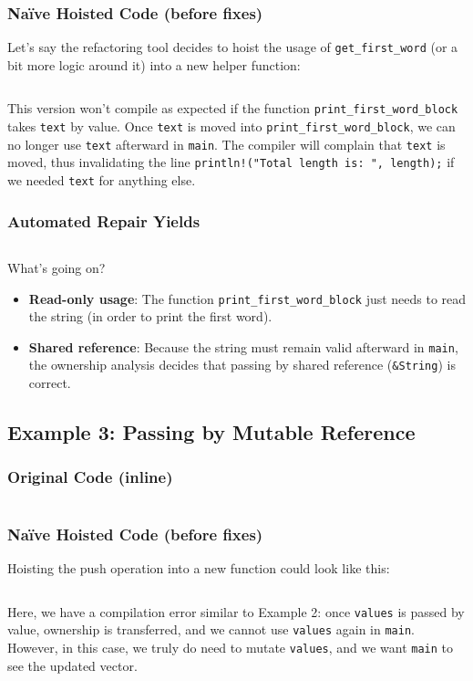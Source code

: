\subsubsection*{Na\"ive Hoisted Code (before fixes)}
Let's say the refactoring tool decides to hoist the usage of \texttt{get\_first\_word} (or
a bit more logic around it) into a new helper function:
\inputminted{rust}{6_appendices/app1_code/ex2_nhc.rs}
This version won't compile as expected if the function
\texttt{print\_first\_word\_block} takes \texttt{text} by value. Once \texttt{text}
is moved into \texttt{print\_first\_word\_block}, we can no longer use
\texttt{text} afterward in \texttt{main}. The compiler will complain that
\texttt{text} is moved, thus invalidating the line \texttt{println!("Total
length is: {}", length);} if we needed \texttt{text} for anything else.

\subsubsection*{Automated Repair Yields}
\inputminted{rust}{6_appendices/app1_code/ex2_ar.rs}
\noindent What's going on?
\begin{itemize}
    \item \textbf{Read-only usage}: The function \texttt{print\_first\_word\_block}
    just needs to read the string (in order to print the first word).
    \item \textbf{Shared reference}: Because the string must remain valid
    afterward in \texttt{main}, the ownership analysis decides that passing by
    shared reference (\texttt{\&String}) is correct.
\end{itemize}

\subsection{Example 3: Passing by Mutable Reference}
\subsubsection*{Original Code (inline)}
\inputminted{rust}{6_appendices/app1_code/ex3_oc.rs}

\subsubsection*{Na\"ive Hoisted Code (before fixes)}
Hoisting the push operation into a new function could look like this:
\inputminted{rust}{6_appendices/app1_code/ex3_nhc.rs}
Here, we have a compilation error similar to Example 2: once \texttt{values} is
passed by value, ownership is transferred, and we cannot use \texttt{values}
again in \texttt{main}. However, in this case, we truly do need to mutate
\texttt{values}, and we want \texttt{main} to see the updated vector.

